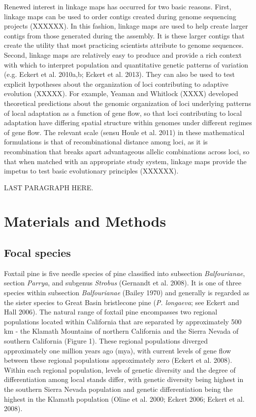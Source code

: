 \documentclass[11pt]{article}
\begin{document}
Renewed interest in linkage maps has occurred for two basic reasons. First, linkage maps can be used 
to order contigs created during genome sequencing projects (XXXXXX). In this fashion, linkage maps are
used to help create larger contigs from those generated during the assembly. It is these larger contigs that
create the utility that most practicing scientists attribute to genome sequences. Second, linkage maps are 
relatively easy to produce and provide a rich context with which to interpret
population and quantitative genetic patterns of variation (e.g. Eckert et al. 2010a,b; Eckert et al. 2013). 
They can also be used to test explicit hypotheses about the organization of loci contributing to 
adaptive evolution (XXXXX). For example, Yeaman and Whitlock (XXXX) developed theoretical predictions
about the genomic organization of loci underlying patterns of local adaptation as a function of gene 
flow, so that loci contributing to local adaptation have differing spatial structure within genomes
under different regimes of gene flow. The relevant scale (sensu Houle et al. 2011) in these mathematical formulations 
is that of recombinational distance among loci,
as it is recombination that breaks apart advantageous allelic combinations across loci, so that when 
matched with an appropriate study system, linkage maps provide the impetus to test basic 
evolutionary principles (XXXXXX). 

LAST PARAGRAPH HERE.


\section{Materials and Methods}

\subsection{Focal species}
Foxtail pine is five needle species of pine classified into 
subsection \textit{Balfourianae}, section \textit{Parrya}, and subgenus \textit{Strobus} 
(Gernandt et al. 2008). It is one of three species within subsection \textit{Balfourianae} 
(Bailey 1970) and generally is regarded as the sister species to Great Basin bristlecone pine (\textit{P. longaeva}; see 
Eckert and Hall 2006). The natural range of foxtail pine encompasses two 
regional populations located within California that are separated by approximately 500 km - 
the Klamath Mountains of northern California and the Sierra Nevada of southern California 
(Figure 1). These regional populations diverged approximately one million years ago (mya), 
with current levels of gene flow between these regional populations approximately zero 
(Eckert et al. 2008). Within each regional population, levels of genetic diversity and the 
degree of differentiation among local stands differ, with genetic diversity being highest in 
the southern Sierra Nevada population and genetic differentiation being the highest in the 
Klamath population (Oline et al. 2000; Eckert 2006; Eckert et al. 2008).
\end{document}
